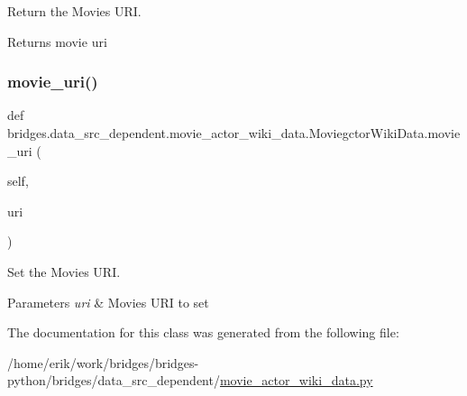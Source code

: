 Return the Movie\textquotesingle{}s U\+RI. 

\begin{DoxyReturn}{Returns}
movie uri 
\end{DoxyReturn}
\mbox{\label{classbridges_1_1data__src__dependent_1_1movie__actor__wiki__data_1_1_moviegctor_wiki_data_a117993e95f4b9ab03b2cfeaa933eb0e0}} 
\subsubsection{\texorpdfstring{movie\+\_\+uri()}{movie\_uri()}\hspace{0.1cm}{\footnotesize\ttfamily [2/2]}}
{\footnotesize\ttfamily def bridges.\+data\+\_\+src\+\_\+dependent.\+movie\+\_\+actor\+\_\+wiki\+\_\+data.\+Moviegctor\+Wiki\+Data.\+movie\+\_\+uri (\begin{DoxyParamCaption}\item[{}]{self,  }\item[{}]{uri }\end{DoxyParamCaption})}



Set the Movie\textquotesingle{}s U\+RI. 


\begin{DoxyParams}{Parameters}
{\em uri} & Movie\textquotesingle{}s U\+RI to set \\
\hline
\end{DoxyParams}


The documentation for this class was generated from the following file\+:\begin{DoxyCompactItemize}
\item 
/home/erik/work/bridges/bridges-\/python/bridges/data\+\_\+src\+\_\+dependent/\hyperlink{movie__actor__wiki__data_8py}{movie\+\_\+actor\+\_\+wiki\+\_\+data.\+py}\end{DoxyCompactItemize}
